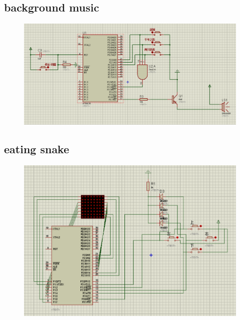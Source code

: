 \documentclass[UTF8]{ctexart}
\begin{document}
\subsection{background music}
\begin{figure}[ht]
	\centering
	\includegraphics[scale=0.6]{backgroundmusic.png}
\end{figure}
\subsection{eating snake}
\begin{figure}[ht]
	\centering
	\includegraphics[scale=0.6]{snake.png}
\end{figure}
\end{document}
